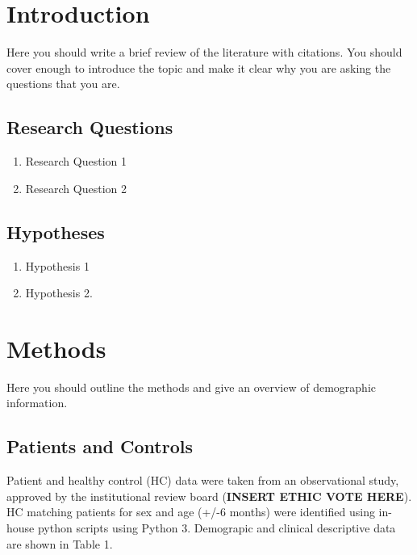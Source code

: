 \documentclass[11pt,]{article}
\providecommand{\tightlist}{%
\setlength{\itemsep}{0pt}\setlength{\parskip}{0pt}}
\begin{document}
\section{Introduction}\label{introduction}

Here you should write a brief review of the literature with citations.
You should cover enough to introduce the topic and make it clear why you
are asking the questions that you are.

\subsection{Research Questions}\label{research-questions}

\begin{enumerate}
\def\labelenumi{\arabic{enumi}.}
\tightlist
\item
  Research Question 1
\item
  Research Question 2
\end{enumerate}

\subsection{Hypotheses}\label{hypotheses}

\begin{enumerate}
\def\labelenumi{\arabic{enumi}.}
\tightlist
\item
  Hypothesis 1
\item
  Hypothesis 2.
\end{enumerate}

\section{Methods}\label{methods}

Here you should outline the methods and give an overview of demographic
information.

\subsection{Patients and Controls}\label{patients-and-controls}

Patient and healthy control (HC) data were taken from an observational
study, approved by the institutional review board (\textbf{INSERT ETHIC
VOTE HERE}). HC matching patients for sex and age (+/-6 months) were
identified using in-house python scripts using Python 3. Demograpic and
clinical descriptive data are shown in Table 1.
\end{document}
